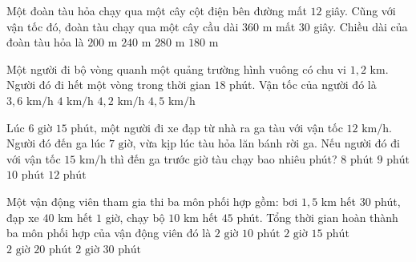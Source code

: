 \begin{ex} %
Một đoàn tàu hỏa chạy qua một cây cột điện bên đường mất $12$ giây. Cũng với vận tốc đó, đoàn tàu chạy qua một cây cầu dài $360\text{ m}$ mất $30$ giây. Chiều dài của đoàn tàu hỏa là
\choice
{$200\text{ m}$}
{\True $240\text{ m}$}
{$280\text{ m}$}
{$180\text{ m}$}
\end{ex}

\begin{ex} %
Một người đi bộ vòng quanh một quảng trường hình vuông có chu vi $1{,}2\text{ km}$. Người đó đi hết một vòng trong thời gian $18$ phút. Vận tốc của người đó là
\choice
{$3{,}6\text{ km/h}$}
{\True $4\text{ km/h}$}
{$4{,}2\text{ km/h}$}
{$4{,}5\text{ km/h}$}
\end{ex}

\begin{ex} %
Lúc $6\text{ giờ } 15\text{ phút}$, một người đi xe đạp từ nhà ra ga tàu với vận tốc $12\text{ km/h}$. Người đó đến ga lúc $7\text{ giờ}$, vừa kịp lúc tàu hỏa lăn bánh rời ga. Nếu người đó đi với vận tốc $15\text{ km/h}$ thì đến ga trước giờ tàu chạy bao nhiêu phút?
\choice
{$8\text{ phút}$}
{\True $9\text{ phút}$}
{$10\text{ phút}$}
{$12\text{ phút}$}
\end{ex}

\begin{ex} %
Một vận động viên tham gia thi ba môn phối hợp gồm: bơi $1{,}5\text{ km}$ hết $30$ phút, đạp xe $40\text{ km}$ hết $1$ giờ, chạy bộ $10\text{ km}$ hết $45$ phút. Tổng thời gian hoàn thành ba môn phối hợp của vận động viên đó là
\choice
{$2\text{ giờ } 10\text{ phút}$}
{\True $2\text{ giờ } 15\text{ phút}$}
{$2\text{ giờ } 20\text{ phút}$}
{$2\text{ giờ } 30\text{ phút}$}
\end{ex}

